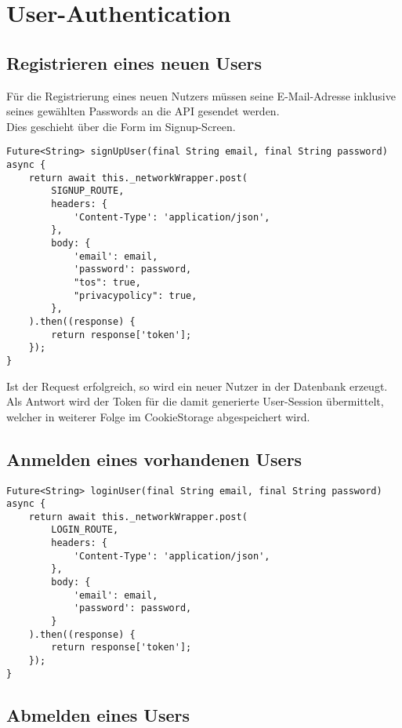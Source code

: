 \section{User-Authentication}



\subsection{Registrieren eines neuen Users}

Für die Registrierung eines neuen Nutzers müssen seine E-Mail-Adresse inklusive seines 
gewählten Passwords an die API gesendet werden.\\
Dies geschieht über die Form im Signup-Screen.

\begin{lstlisting}
Future<String> signUpUser(final String email, final String password) async {
    return await this._networkWrapper.post(
        SIGNUP_ROUTE,
        headers: {
            'Content-Type': 'application/json',
        },
        body: {
            'email': email,
            'password': password,
            "tos": true,
            "privacypolicy": true,
        },
    ).then((response) {
        return response['token'];
    });
}
\end{lstlisting}

Ist der Request erfolgreich, so wird ein neuer Nutzer in der Datenbank erzeugt. Als Antwort wird der
Token für die damit generierte User-Session übermittelt, welcher in weiterer Folge im CookieStorage
abgespeichert wird.

\subsection{Anmelden eines vorhandenen Users}

\begin{lstlisting}
Future<String> loginUser(final String email, final String password) async {
    return await this._networkWrapper.post(
        LOGIN_ROUTE,
        headers: {
            'Content-Type': 'application/json',
        },
        body: {
            'email': email,
            'password': password,
        }
    ).then((response) {
        return response['token'];
    });
}
\end{lstlisting}

\subsection{Abmelden eines Users}

